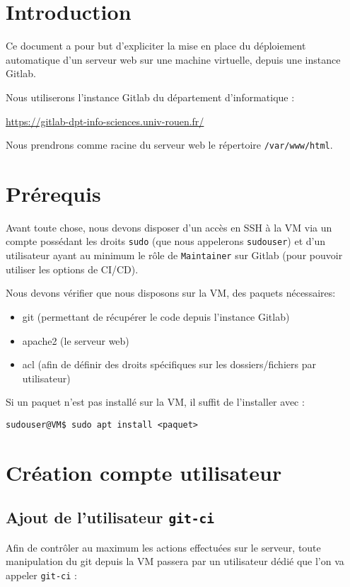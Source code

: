 \section{Introduction}
\label{introduction}

Ce document a pour but d'expliciter la mise en place du déploiement automatique d'un serveur web sur une machine virtuelle, depuis une instance Gitlab.

Nous utiliserons l'instance Gitlab du département d'informatique :

\url{https://gitlab-dpt-info-sciences.univ-rouen.fr/}

Nous prendrons comme racine du serveur web le répertoire \texttt{/var/www/html}.


\section{Prérequis}
Avant toute chose, nous devons disposer d'un accès en SSH à la VM via un compte possédant les droits \texttt{sudo} (que nous appelerons \texttt{sudouser}) et d'un utilisateur ayant au minimum le rôle de \texttt{Maintainer} sur Gitlab (pour pouvoir utiliser les options de CI/CD).

Nous devons vérifier que nous disposons sur la VM, des paquets nécessaires:

\begin{itemize}
    \item git (permettant de récupérer le code depuis l'instance Gitlab)
    \item apache2 (le serveur web)
    \item acl (afin de définir des droits spécifiques sur les dossiers/fichiers par utilisateur)
\end{itemize}


Si un paquet n'est pas installé sur la VM, il suffit de l'installer avec :

    \begin{verbatim}
sudouser@VM$ sudo apt install <paquet>    
    \end{verbatim}


\section{Création compte utilisateur}

\subsection{Ajout de l'utilisateur \texttt{git-ci}}
Afin de contrôler au maximum les actions effectuées sur le serveur, toute manipulation du git depuis la VM passera par un utilisateur dédié que l'on va appeler \texttt{git-ci} :

